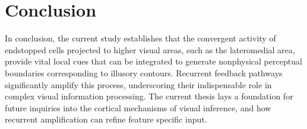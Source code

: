 \documentclass[12pt]{article}
\begin{document}
\section*{Conclusion}
In conclusion, the current study establishes that the convergent activity of endstopped cells projected to higher visual areas, such as the lateromedial area, provide vital  local cues that can be integrated to generate nonphysical perceptual boundaries corresponding to illusory contours. Recurrent feedback pathways significantly amplify this process, underscoring their indispensable role in complex visual information processing. The current thesis lays a foundation for future inquiries into the cortical mechanisms of visual inference, and how recurrent amplification can refine feature specific input. 




 
\end{document}
